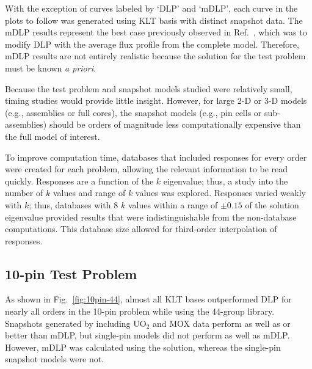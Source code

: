 \documentclass[5p,times,twocolumn,10pt]{elsarticle}
\newcommand{\REF}[1]{Ref.~\citen{#1}}               %
\begin{document}
    With the exception of curves labeled by `DLP' and `mDLP', each curve in 
    the plots to follow was generated using KLT 
    basis with distinct snapshot data.
    The mDLP results represent the best case previously observed in 
    \REF{Roberts2014}, which was to modify DLP with
    the average flux profile from the complete model.  Therefore, mDLP results 
    are not entirely realistic because the solution
    for the test problem must be known {\it a priori}.
    
    Because the test problem and snapshot models studied were relatively small, 
    timing studies would 
    provide little insight.  However, for large 2-D or 3-D models (e.g., 
    assemblies or full cores), the snapshot
    models (e.g., pin cells or sub-assemblies) should be orders of magnitude 
    less computationally expensive
    than the full model of interest.
    
    To improve computation time, databases that included responses for every 
    order were created for each problem, 
    allowing the relevant information to be read quickly.  Responses are a 
    function of the $k$ eigenvalue; thus, a study into
    the number of $k$ values and range of $k$ values was explored.  Responses 
    varied weakly with $k$; thus, databases with 8 $k$ values
    within a range of $\pm0.15$ of the solution eigenvalue provided results 
that were indistinguishable from the non-database computations. This database 
size allowed
    for third-order interpolation of responses.
    
    \subsection{10-pin Test Problem}
    
    As shown in Fig.~\ref{fig:10pin-44}, almost all KLT bases outperformed DLP 
    for nearly all orders in the 10-pin problem while using the 44-group 
    library.  
    Snapshots generated by including UO$_2$ and MOX data perform as well as or 
    better than mDLP, but single-pin
    models did not perform as well as mDLP.  However, mDLP was calculated using 
    the solution, whereas the single-pin snapshot models were not.
    
\end{document}
